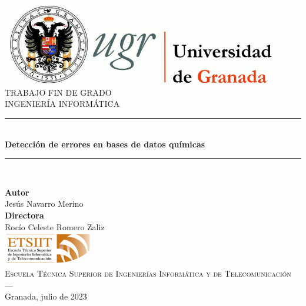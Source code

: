 \begin{titlepage}
 
 
\newlength{\centeroffset}
\setlength{\centeroffset}{-0.5\oddsidemargin}
\addtolength{\centeroffset}{0.5\evensidemargin}
\thispagestyle{empty}

\noindent\hspace*{\centeroffset}\begin{minipage}{\textwidth}

\centering
\includegraphics[width=0.9\textwidth]{imagenes/logos/logo_ugr.jpg}\\[1.4cm]

\textsc{ \Large TRABAJO FIN DE GRADO\\[0.2cm]}
\textsc{ INGENIERÍA INFORMÁTICA}\\[1cm]
% 
\noindent\rule[-1ex]{\textwidth}{2pt}\\[3ex]
{\Huge\bfseries Detección de errores en bases de datos químicas\\
}
\noindent\rule[-3ex]{\textwidth}{2pt}\\[3ex]
\end{minipage}

\vspace{1.5cm}
\noindent\hspace*{\centeroffset}\begin{minipage}{\textwidth}
\centering

\textbf{Autor}\\ {Jesús Navarro Merino}\\[2.5ex]
\textbf{Directora}\\
{Rocío Celeste Romero Zaliz}\\[2cm]
\includegraphics[width=0.3\textwidth]{imagenes/logos/etsiit_logo.png}\\[0.1cm]
\textsc{Escuela Técnica Superior de Ingenierías Informática y de Telecomunicación}\\
\textsc{---}\\
Granada, julio de 2023
\end{minipage}
\end{titlepage}

